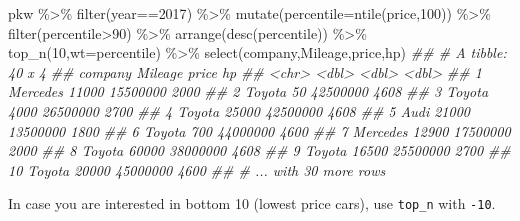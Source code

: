 \documentclass[
  letterpaper,
  DIV=11,
  numbers=noendperiod]{scrartcl}
\newenvironment{Shaded}{\begin{snugshade}}{\end{snugshade}}
\newcommand{\AttributeTok}[1]{\textcolor[rgb]{0.40,0.45,0.13}{#1}}
\newcommand{\DecValTok}[1]{\textcolor[rgb]{0.68,0.00,0.00}{#1}}
\newcommand{\DocumentationTok}[1]{\textcolor[rgb]{0.37,0.37,0.37}{\textit{#1}}}
\newcommand{\FunctionTok}[1]{\textcolor[rgb]{0.28,0.35,0.67}{#1}}
\newcommand{\NormalTok}[1]{\textcolor[rgb]{0.00,0.23,0.31}{#1}}
\newcommand{\SpecialCharTok}[1]{\textcolor[rgb]{0.37,0.37,0.37}{#1}}
\begin{document}
\begin{Shaded}
\begin{Highlighting}[]
\NormalTok{pkw }\SpecialCharTok{\%\textgreater{}\%} \FunctionTok{filter}\NormalTok{(year}\SpecialCharTok{==}\DecValTok{2017}\NormalTok{) }\SpecialCharTok{\%\textgreater{}\%} 
  \FunctionTok{mutate}\NormalTok{(}\AttributeTok{percentile=}\FunctionTok{ntile}\NormalTok{(price,}\DecValTok{100}\NormalTok{)) }\SpecialCharTok{\%\textgreater{}\%} 
  \FunctionTok{filter}\NormalTok{(percentile}\SpecialCharTok{\textgreater{}}\DecValTok{90}\NormalTok{) }\SpecialCharTok{\%\textgreater{}\%} 
  \FunctionTok{arrange}\NormalTok{(}\FunctionTok{desc}\NormalTok{(percentile)) }\SpecialCharTok{\%\textgreater{}\%} 
  \FunctionTok{top\_n}\NormalTok{(}\DecValTok{10}\NormalTok{,}\AttributeTok{wt=}\NormalTok{percentile) }\SpecialCharTok{\%\textgreater{}\%} 
  \FunctionTok{select}\NormalTok{(company,Mileage,price,hp)}
\DocumentationTok{\#\# \# A tibble: 40 x 4}
\DocumentationTok{\#\#    company  Mileage    price    hp}
\DocumentationTok{\#\#    \textless{}chr\textgreater{}      \textless{}dbl\textgreater{}    \textless{}dbl\textgreater{} \textless{}dbl\textgreater{}}
\DocumentationTok{\#\#  1 Mercedes   11000 15500000  2000}
\DocumentationTok{\#\#  2 Toyota        50 42500000  4608}
\DocumentationTok{\#\#  3 Toyota      4000 26500000  2700}
\DocumentationTok{\#\#  4 Toyota     25000 42500000  4608}
\DocumentationTok{\#\#  5 Audi       21000 13500000  1800}
\DocumentationTok{\#\#  6 Toyota       700 44000000  4600}
\DocumentationTok{\#\#  7 Mercedes   12900 17500000  2000}
\DocumentationTok{\#\#  8 Toyota     60000 38000000  4608}
\DocumentationTok{\#\#  9 Toyota     16500 25500000  2700}
\DocumentationTok{\#\# 10 Toyota     20000 45000000  4600}
\DocumentationTok{\#\# \# ... with 30 more rows}
\end{Highlighting}
\end{Shaded}

In case you are interested in bottom 10 (lowest price cars), use
\texttt{top\_n} with \texttt{-10}.
\end{document}
